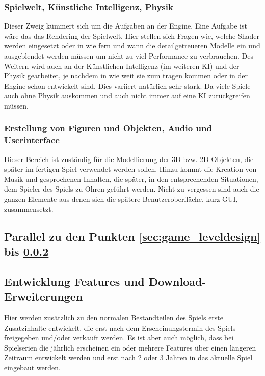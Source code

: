 \subsubsection{Spielwelt, Künstliche Intelligenz, Physik}
\label{sec:spielwelt_ki_physik}
Dieser Zweig kümmert sich um die Aufgaben an der Engine. Eine Aufgabe ist wäre das das Rendering der Spielwelt. Hier stellen sich Fragen wie, welche Shader werden eingesetzt oder in wie fern und wann die detailgetreueren Modelle ein und ausgeblendet werden müssen um nicht zu viel Performance zu verbrauchen. Des Weitern wird auch an der Künstlichen Intelligenz (im weiteren KI) und der Physik gearbeitet, je nachdem in wie weit sie zum tragen kommen oder in der Engine schon entwickelt sind. Dies variiert natürlich sehr stark. Da viele Spiele auch ohne Physik auskommen und auch nicht immer auf eine KI zurückgreifen müssen. 
                                                           
\subsubsection{Erstellung von Figuren und Objekten, Audio und Userinterface}
\label{sec:erstellung_figure_objekte_audio_gui}
Dieser Bereich ist zuständig für die Modellierung der 3D bzw. 2D Objekten, die später im fertigen Spiel verwendet werden sollen. Hinzu kommt die Kreation von Musik und gesprochenen Inhalten, die später, in den entsprechenden Situationen, dem Spieler des Spiels zu Ohren geführt werden. Nicht zu vergessen sind auch die ganzen Elemente aus denen sich die spätere Benutzeroberfläche, kurz GUI, zusammensetzt. 

\subsection{Parallel zu den Punkten \ref{sec:game_leveldesign} bis \ref{sec:erstellung_figure_objekte_audio_gui}}
\subsection{Entwicklung Features und Download-Erweiterungen}
Hier werden zusätzlich zu den normalen Bestandteilen des Spiels erste Zusatzinhalte entwickelt, die erst nach dem Erscheinungstermin des Spiels freigegeben und/oder verkauft werden. Es ist aber auch möglich, dass bei Spielserien die jährlich erscheinen ein oder mehrere Features über einen längeren Zeitraum entwickelt werden und erst nach 2 oder 3 Jahren in das aktuelle Spiel eingebaut werden.
